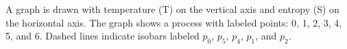 A graph is drawn with temperature (T) on the vertical axis and entropy (S) on the horizontal axis. The graph shows a process with labeled points: 0, 1, 2, 3, 4, 5, and 6. Dashed lines indicate isobars labeled \( p_0 \), \( p_5 \), \( p_4 \), \( p_1 \), and \( p_2 \).